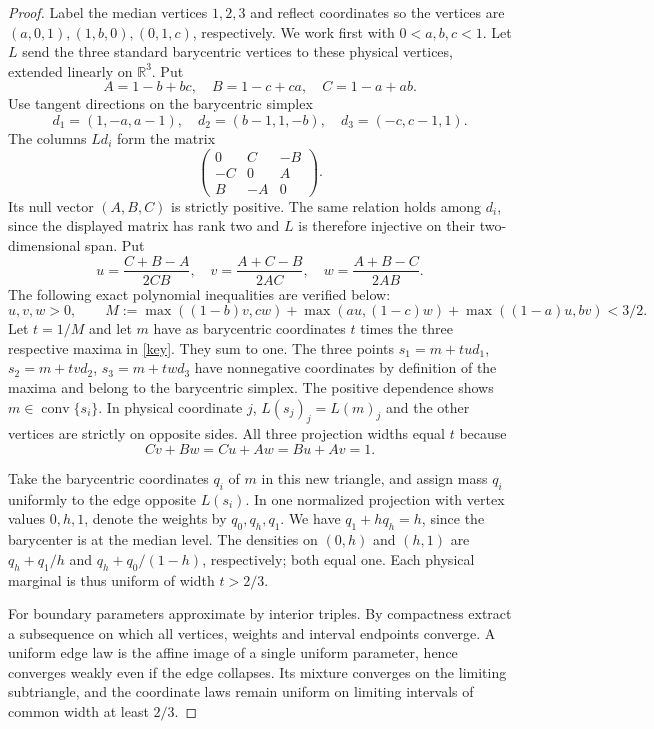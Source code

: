 \documentclass[11pt]{article}
\begin{document}
\begin{proof} Label the median vertices $1,2,3$ and reflect coordinates so the vertices are $(a,0,1),(1,b,0),(0,1,c)$, respectively. We work first with $0<a,b,c<1$. Let $L$ send the three standard barycentric vertices to these physical vertices, extended linearly on $\mathbb R^3$. Put
\[
 A=1-b+bc,\quad B=1-c+ca,\quad C=1-a+ab.
\]
Use tangent directions on the barycentric simplex
\[
 d_1=(1,-a,a-1),\quad d_2=(b-1,1,-b),\quad d_3=(-c,c-1,1).
\]
The columns $Ld_i$ form the matrix
\[
 \begin{pmatrix}0&C&-B\\-C&0&A\\B&-A&0\end{pmatrix}.
\]
Its null vector $(A,B,C)$ is strictly positive. The same relation holds among $d_i$, since the displayed matrix has rank two and $L$ is therefore injective on their two-dimensional span. Put
\[
 u=\frac{C+B-A}{2CB},\quad v=\frac{A+C-B}{2AC},\quad w=\frac{A+B-C}{2AB}.
\]
The following exact polynomial inequalities are verified below:
\begin{equation}\label{key}
 u,v,w>0,\qquad M:=\max((1-b)v,cw)+\max(au,(1-c)w)+\max((1-a)u,bv)<3/2.
\end{equation}
Let $t=1/M$ and let $m$ have as barycentric coordinates $t$ times the three respective maxima in \eqref{key}. They sum to one. The three points $s_1=m+tud_1$, $s_2=m+tvd_2$, $s_3=m+twd_3$ have nonnegative coordinates by definition of the maxima and belong to the barycentric simplex. The positive dependence shows $m\in\operatorname{conv}\{s_i\}$. In physical coordinate $j$, $L(s_j)_j=L(m)_j$ and the other vertices are strictly on opposite sides. All three projection widths equal $t$ because
\[
 Cv+Bw=Cu+Aw=Bu+Av=1.
\]

Take the barycentric coordinates $q_i$ of $m$ in this new triangle, and assign mass $q_i$ uniformly to the edge opposite $L(s_i)$. In one normalized projection with vertex values $0,h,1$, denote the weights by $q_0,q_h,q_1$. We have $q_1+hq_h=h$, since the barycenter is at the median level. The densities on $(0,h)$ and $(h,1)$ are $q_h+q_1/h$ and $q_h+q_0/(1-h)$, respectively; both equal one. Each physical marginal is thus uniform of width $t>2/3$.

For boundary parameters approximate by interior triples. By compactness extract a subsequence on which all vertices, weights and interval endpoints converge. A uniform edge law is the affine image of a single uniform parameter, hence converges weakly even if the edge collapses. Its mixture converges on the limiting subtriangle, and the coordinate laws remain uniform on limiting intervals of common width at least $2/3$.
\end{proof}
\end{document}

